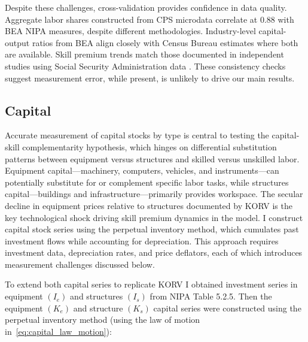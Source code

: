 \documentclass[12pt]{article}
\begin{document}
Despite these challenges, cross-validation provides confidence in data quality. Aggregate labor shares constructed from CPS microdata correlate at 0.88 with BEA NIPA measures, despite different methodologies. Industry-level capital-output ratios from BEA align closely with Census Bureau estimates where both are available. Skill premium trends match those documented in independent studies using Social Security Administration data \citep{song2019firming}. These consistency checks suggest measurement error, while present, is unlikely to drive our main results.

\subsection{Capital}\label{sec:capital_data}

Accurate measurement of capital stocks by type is central to testing the capital-skill complementarity hypothesis, which hinges on differential substitution patterns between equipment versus structures and skilled versus unskilled labor. Equipment capital---machinery, computers, vehicles, and instruments---can potentially substitute for or complement specific labor tasks, while structures capital---buildings and infrastructure---primarily provides workspace. The secular decline in equipment prices relative to structures documented by KORV is the key technological shock driving skill premium dynamics in the model. I construct capital stock series using the perpetual inventory method, which cumulates past investment flows while accounting for depreciation. This approach requires investment data, depreciation rates, and price deflators, each of which introduces measurement challenges discussed below.

To extend both capital series to replicate KORV I obtained investment series in equipment $(I_e)$ and structures $(I_s)$ from NIPA Table 5.2.5. Then the equipment $(K_e)$ and structure $(K_s)$ capital series were constructed using the perpetual inventory method (using the law of motion in~\eqref{eq:capital_law_motion}):
\end{document}
